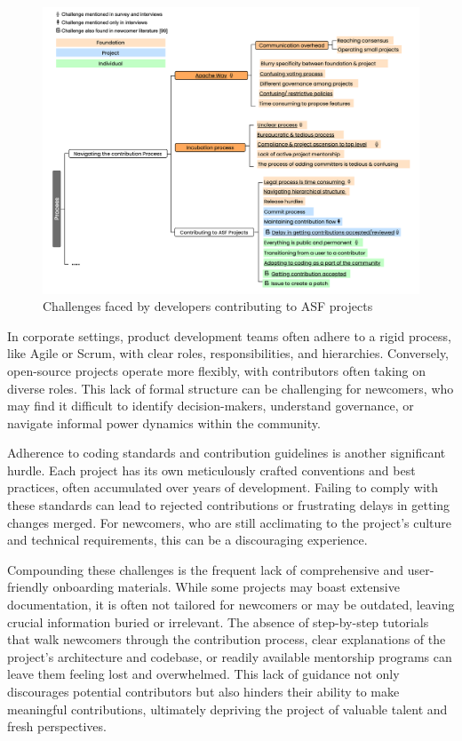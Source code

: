 \begin{figure}[ht]
    \centering
    \includegraphics[width=1\linewidth]{figs/processChallenges.png}
    \caption{Challenges faced by developers contributing to ASF projects \cite{04guizani2021long}}
    \label{fig:processChallenges}
\end{figure}


In corporate settings, product development teams often adhere to a rigid process, like Agile or Scrum, with clear roles, responsibilities, and hierarchies. Conversely, open-source projects operate more flexibly, with contributors often taking on diverse roles. This lack of formal structure can be challenging for newcomers, who may find it difficult to identify decision-makers, understand governance, or navigate informal power dynamics within the community.


Adherence to coding standards and contribution guidelines is another significant hurdle. Each project has its own meticulously crafted conventions and best practices, often accumulated over years of development. Failing to comply with these standards can lead to rejected contributions or frustrating delays in getting changes merged. For newcomers, who are still acclimating to the project's culture and technical requirements, this can be a discouraging experience.

Compounding these challenges is the frequent lack of comprehensive and user-friendly onboarding materials. While some projects may boast extensive documentation, it is often not tailored for newcomers or may be outdated, leaving crucial information buried or irrelevant. The absence of step-by-step tutorials that walk newcomers through the contribution process, clear explanations of the project's architecture and codebase, or readily available mentorship programs can leave them feeling lost and overwhelmed. This lack of guidance not only discourages potential contributors but also hinders their ability to make meaningful contributions, ultimately depriving the project of valuable talent and fresh perspectives.

